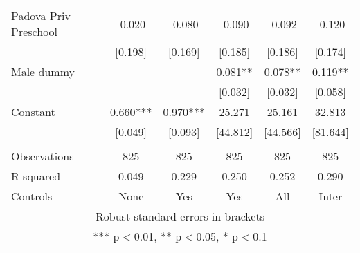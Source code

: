 \begin{tabular}{lccccc}
Padova Priv Preschool & -0.020 & -0.080 & -0.090 & -0.092 & -0.120 \\
 & [0.198] & [0.169] & [0.185] & [0.186] & [0.174] \\
Male dummy &  &  & 0.081** & 0.078** & 0.119** \\
 &  &  & [0.032] & [0.032] & [0.058] \\
Constant & 0.660*** & 0.970*** & 25.271 & 25.161 & 32.813 \\
 & [0.049] & [0.093] & [44.812] & [44.566] & [81.644] \\
 &  &  &  &  &  \\
Observations & 825 & 825 & 825 & 825 & 825 \\
R-squared & 0.049 & 0.229 & 0.250 & 0.252 & 0.290 \\
 Controls & None & Yes & Yes & All & Inter \\ \hline
\multicolumn{6}{c}{ Robust standard errors in brackets} \\
\multicolumn{6}{c}{ *** p$<$0.01, ** p$<$0.05, * p$<$0.1} \\
\end{tabular}
